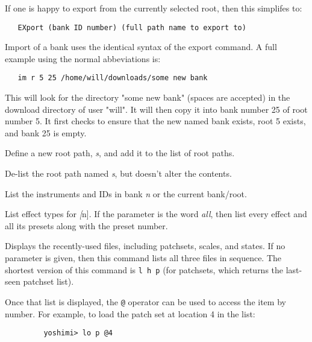   If one is happy to export from the currently selected root, then this
   simplifes to:

\begin{verbatim}
   EXport (bank ID number) (full path name to export to)
\end{verbatim}

      Import of a bank uses the identical syntax of the export command.
      A full example using the normal abbeviations is:

\begin{verbatim}
   im r 5 25 /home/will/downloads/some new bank
\end{verbatim}

      This will look for the directory "some new bank" (spaces are accepted) in
      the download directory of user "will". It will then copy it into bank number
      25 of root number 5. It first checks to ensure that the new named bank
      exists, root 5 exists, and bank 25 is empty.

      Define a new root path, \textsl{s}, and add it to the list of root paths.

      De-list the root path named \textsl{s}, but doesn't alter the contents.

      List the instruments and IDs in bank \textsl{n} or the
      current bank/root.

      List effect types for \textsl[n].
      If the parameter is the word \textsl{all},
      then list every effect and all its
      presets along with the preset number.

      Displays the recently-used files, including patchsets, scales, and
      states.  If no parameter is given, then this command lists all three
      files in sequence.  The shortest version of this command is
      \texttt{l h p} (for patchsets, which returns the last-seen patchset list).

      Once that list is displayed,
      the \texttt{@} operator can be used to access
      the item by number.  For example, to load the patch set at location 4 in
      the list:

      \begin{verbatim}
         yoshimi> lo p @4
      \end{verbatim}

